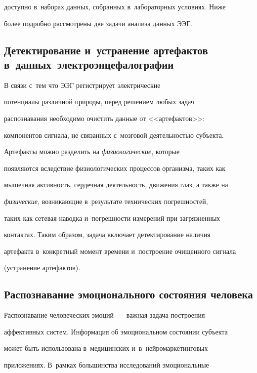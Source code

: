 доступно в~наборах данных, собранных в~лабораторных условиях. Ниже 

более подробно рассмотрены две задачи анализа данных ЭЭГ.

     

\subsection{Детектирование и~устранение артефактов в~данных~электроэнцефалографии}

     

     В связи с~тем что ЭЭГ регистрирует электрические 

потенциалы различной природы, перед решением любых задач 

распознавания необходимо очистить данные от <<артефактов>>: 

компонентов сигнала, не связанных с~мозговой деятельностью субъекта. 

Артефакты можно разделить на \textit{физиологические}, которые 

появляются вследствие физиологических процессов организма, таких как 

мышечная активность, сердечная деятельность, движения глаз, а также на 

\textit{физические}, возникающие в~результате технических погрешностей, 

таких как сетевая наводка и~погрешности измерений при загрязненных 

контактах. Таким образом, задача включает детектирование наличия 

артефакта в~конкретный момент времени и~построение очищенного сигнала 

(устранение артефактов).



\subsection{Распознавание эмоционального состояния человека}

     

     Распознавание человеческих эмоций~--- важная задача построения 

аффективных систем. Информация об эмоциональном состоянии субъекта 

может быть использована в~медицинских и~в~нейромаркетинговых~\cite{4-sha} 

приложениях. В~рамках большинства исследований эмоциональные 

